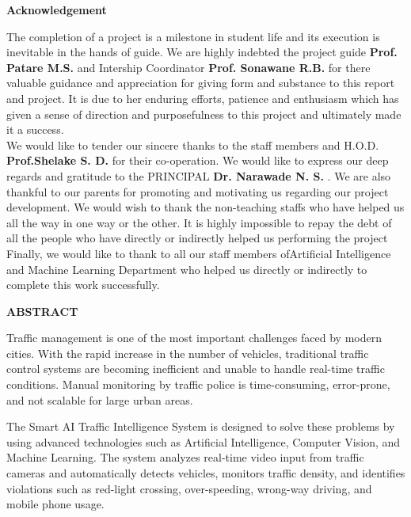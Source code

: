 \documentclass[12,Times new Roman,a4paper]{report}
\begin{document}
\newpage
\begin{center}
\Large{\textbf{Acknowledgement}}\\[1cm]
\end{center}
\large{The completion of a project is a milestone in student life and its 
execution is inevitable in the hands of guide. We are highly indebted the project 
guide \textbf{Prof. Patare M.S. } and Intership Coordinator \textbf{Prof. Sonawane R.B.} for there valuable guidance and appreciation for giving 
form and substance to this report and project. It is due to her enduring efforts, patience and 
enthusiasm which has given a sense of direction and purposefulness to this project 
and ultimately made it a success.}\\[0.5cm]
\large {We would like to tender our sincere thanks to the staff members and 
H.O.D. \\ \textbf{Prof.Shelake S. D.} for their co-operation. We would like to express our 
deep regards and gratitude to the PRINCIPAL \textbf{Dr. Narawade N. S.} . We are also thankful to our parents 
for promoting and motivating us regarding our project development. We would 
wish to thank the non-teaching staffs who have helped us all the way in one way 
or the other. It is highly impossible to repay the debt of all the people who have 
directly or indirectly helped us performing the project}\\[0.5cm]
\large{Finally, we would like to thank to all our staff members ofArtificial Intelligence and Machine Learning Department who helped us directly or indirectly to complete this work successfully.}


\newpage
\begin{center}

\Large{\textbf{ABSTRACT}}\\[1cm]
\end{center}

Traffic management is one of the most important challenges faced by modern cities. With the rapid increase in the number of vehicles, traditional traffic control systems are becoming inefficient and unable to handle real-time traffic conditions. Manual monitoring by traffic police is time-consuming, error-prone, and not scalable for large urban areas.

The Smart AI Traffic Intelligence System is designed to solve these problems by using advanced technologies such as Artificial Intelligence, Computer Vision, and Machine Learning. The system analyzes real-time video input from traffic cameras and automatically detects vehicles, monitors traffic density, and identifies violations such as red-light crossing, over-speeding, wrong-way driving, and mobile phone usage.
\end{document}
